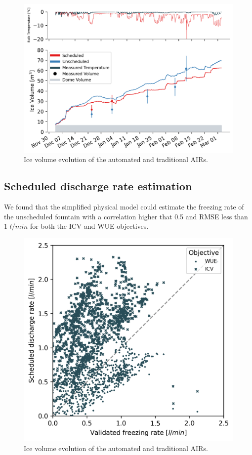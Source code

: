 \documentclass[tc, manuscript]{copernicus}
\begin{document}
\begin{figure}[t]
\includegraphics[width=12cm]{Figures/validation.png}
\caption{Ice volume evolution of the automated and traditional AIRs.}
\label{fig:iceV}
\end{figure}

\subsection{Scheduled discharge rate estimation}

We found that the simplified physical model could estimate the freezing rate of the unscheduled fountain with a
correlation higher that 0.5 and RMSE less than 1 $l/min$ for both the ICV and WUE objectives.

\begin{figure}[t]
\includegraphics[width=12cm]{Figures/freezing_rate_corr.png}
\caption{Ice volume evolution of the automated and traditional AIRs.}
\label{fig:iceV}
\end{figure}
\end{document}
